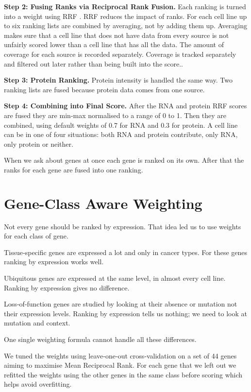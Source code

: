 \documentclass[author={Karen Coutinho, Ishaan Bhalla, Aman Raj, Dixit Kaloorani Malarmannan},
                supervisor={Dr. Daniel D'Andrea},
                degree={MSc},
                title={CellSelector Omics: A Multi-Omics Recommendation System for Cell Line Selection},
                subtitle={},
                type={},
                year={2026}]{dissertation}
\begin{document}
{\bf Step 2: Fusing Ranks via Reciprocal Rank Fusion.} Each ranking is turned into a weight using RRF \cite{cormack2009rrf}. RRF reduces the impact of ranks. For each cell line up to six ranking lists are combined by averaging, not by adding them up. Averaging makes sure that a cell line that does not have data from every source is not unfairly scored lower than a cell line that has all the data. The amount of coverage for each source is recorded separately. Coverage is tracked separately and filtered out later rather than being built into the score..

{\bf Step 3: Protein Ranking.} Protein intensity is handled the same way. Two ranking lists are fused because protein data comes from one source.

{\bf Step 4: Combining into Final Score.} After the RNA and protein RRF scores are fused they are min‑max normalised to a range of 0 to 1. Then they are combined, using default weights of 0.7 for RNA and 0.3 for protein. A cell line can be in one of four situations: both RNA and protein contribute, only RNA, only protein or neither.

When we ask about genes at once each gene is ranked on its own. After that the ranks for each gene are fused into one ranking.

\section{Gene-Class Aware Weighting}

Not every gene should be ranked by expression. That idea led us to use weights for each class of gene.

Tissue‑specific genes are expressed a lot and only in cancer types. For these genes ranking by expression works well.

Ubiquitous genes are expressed at the same level, in almost every cell line. Ranking by expression gives no difference.

Loss‑of‑function genes are studied by looking at their absence or mutation not their expression levels. Ranking by expression tells us nothing; we need to look at mutation and context.

One single weighting formula cannot handle all these differences.

We tuned the weights using leave‑one‑out cross‑validation on a set of 44 genes aiming to maximise Mean Reciprocal Rank. For each gene that we left out we refitted the weights using the other genes in the same class before scoring which helps avoid overfitting.
\end{document}
